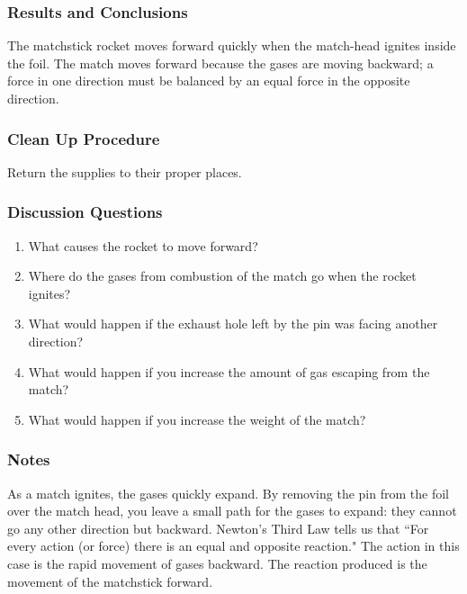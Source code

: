 \subsubsection*{Results and Conclusions}
The matchstick rocket moves forward quickly when the match-head ignites inside the foil.  The match moves forward because the gases are moving backward; a force in one direction must be balanced by an equal force in the opposite direction.  

\subsubsection*{Clean Up Procedure}
Return the supplies to their proper places.

\subsubsection*{Discussion Questions}
\begin{enumerate}
\item{What causes the rocket to move forward?}
\item{Where do the gases from combustion of the match go when the rocket ignites?}
\item{What would happen if the exhaust hole left by the pin was facing another direction?}
\item{What would happen if you increase the amount of gas escaping from the match?}
\item{What would happen if you increase the weight of the match?}
\end{enumerate}

\subsubsection*{Notes}
As a match ignites, the gases quickly expand. By removing the pin from the foil over the match head, you leave a small path for the gases to expand: they cannot go any other direction but backward. Newton's Third Law tells us that ``For every action (or force) there is an equal and opposite reaction." The action in this case is the rapid movement of gases backward. The reaction produced is the movement of the matchstick forward.